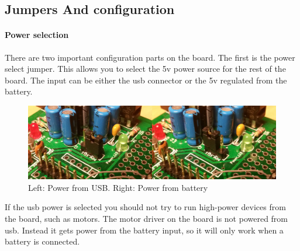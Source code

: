 \documentclass{article}
\begin{document}
\subsection{Jumpers And configuration}
\label{jumper_section}
\paragraph{Power selection}
There are two important configuration parts on the board. The first is the power select jumper. This allows you to select the 5v power source for the rest of the board. The input can be either the usb connector or the 5v regulated from the battery.
\begin{figure}[h!]
	\centering
    \includegraphics[scale=0.25]{power_jumper.jpg}
    \caption{Left: Power from USB. Right: Power from battery}
\end{figure}

If the usb power is selected you should not try to run high-power devices from the board, such as motors. The motor driver on the board is not powered from usb. Instead it gets power from the battery input, so it will only work when a battery is connected.
\end{document}
